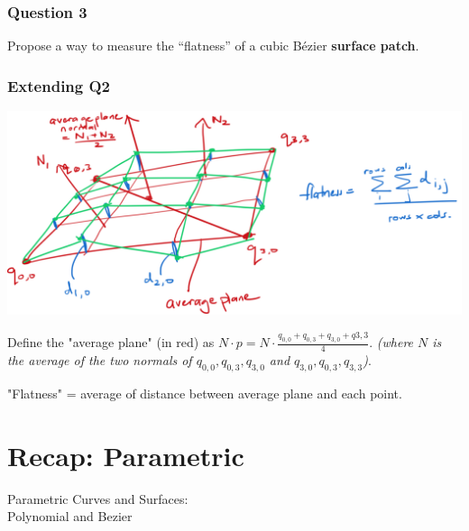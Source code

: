 \documentclass{beamer}
\begin{document}
\begin{frame}
    \frametitle{Question 3}
    Propose a way to measure the “flatness” of a cubic Bézier \textbf{surface patch}.
\end{frame}

\begin{frame}
    \frametitle{Extending Q2}

    \begin{center}
        \includegraphics[scale=0.3]{q3.png}
    \end{center}

    Define the "average plane" (in red) as $N \cdot p = N \cdot \frac{q_{0,0} + q_{0,3} + q_{3,0} + q{3,3}}{4}$.
    \textit{(where $N$ is the average of the two normals of $q_{0,0}, q_{0,3}, q_{3,0}$ and $q_{3,0}, q_{0,3}, q_{3,3}$)}.
    
    \vspace{1em}
    \begin{tcolorbox}
        "Flatness" = average of distance between average plane and each point.
    \end{tcolorbox}

\end{frame}

\section{Recap: Parametric}

\begin{frame}
    \AlegreyaExtraBold \LARGE
    Parametric Curves and Surfaces:\\
    Polynomial and Bezier
\end{frame}
\end{document}
